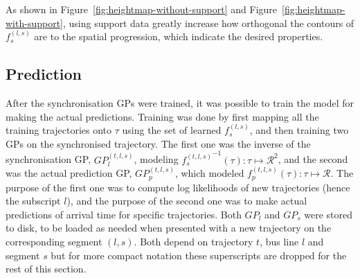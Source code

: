 \noindent
As shown in Figure~\ref{fig:heightmap-without-support} and
Figure~\ref{fig:heightmap-with-support}, using support data greatly
increase how orthogonal the contours of $f^{(l,s)}_s$ are to the
spatial progression, which indicate the desired properties.

\subsection{Prediction}
After the synchronisation GPs were trained, it was possible to train
the model for making the actual predictions. Training was done by
first mapping all the training trajectories onto $\tau$ using the set
of learned $f^{(l,s)}_s$, and then training two GPs on the
synchronised trajectory. The first one was the inverse of the
synchronisation GP, ${GP_l^{(t, l, s)}}$, modeling
${f^{(t, l, s)}_s}^{-1}(\tau) : \tau \mapsto \mathcal{R}^2$,
and the second
was the actual prediction GP, $GP_p^{(t,l,s)}$, which modeled
${f^{(t,l,s)}_p}(\tau) : \tau \mapsto \mathcal{R}$. The purpose
of the first one was to compute log likelihoods of new trajectories
(hence the subscript $l$), and
the purpose of the second one was to make actual predictions of
arrival time for specific trajectories. Both $GP_l$ and $GP_s$ were stored to
disk, to be loaded as needed when presented with a new trajectory on
the corresponding segment $(l, s)$. Both depend on trajectory
$t$, bus line $l$ and segment $s$ but for more compact notation these
superscripts are dropped for the rest of this section.

